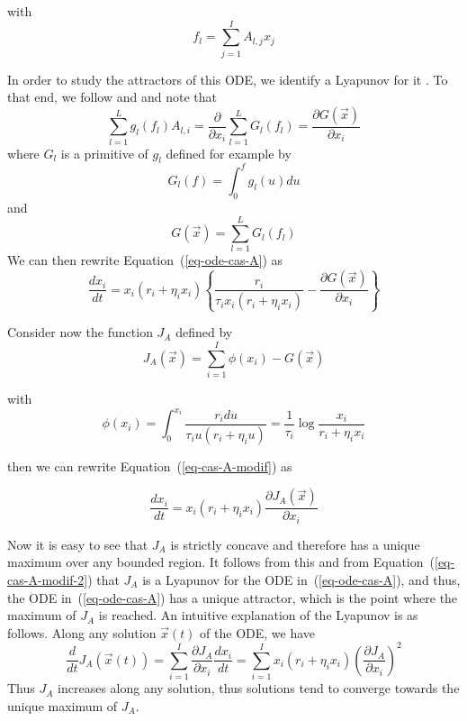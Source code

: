   with
  \begin{equation}
        f_{l} = \sum_{j=1}^{I} A_{l,j} x_{j}
        \label{eq-flux-l}
  \end{equation}

  In order to study the attractors of this ODE, we identify a Lyapunov
  for it \cite{refSurLyapunov}. To that end, we follow \cite{KMT97}
  and \cite{GB98} and note that
  $$
  \sum_{l=1}^{L}
        g_{l}(f_{l})A_{l,i} = \frac{\partial}{\partial x_{i}}\sum_{l=1}^{L}
        G_{l}(f_{l}) = \frac{\partial G (\vec{x})}{\partial x_{i}}
  $$
  where $G_{l}$ is a primitive of $g_{l}$ defined for example by
  $$
  G_{l}(f) = \int_{0}^f g_{l}(u) du
  $$
  and
  $$G(\vec{x}) = \sum_{l=1}^{L} G_{l}(f_{l})
  $$
  We can then rewrite Equation~(\ref{eq-ode-cas-A}) as
  \begin{equation}
                \frac{dx_{i}}{dt}
        =
        x_{i}(r_{i}+ \eta_i x_{i})
        \left \{
            \frac{r_{i}}{\tau_i x_{i}(r_{i}+ \eta_i x_{i})}  -
            \frac{\partial G (\vec{x})}{\partial x_{i}}
        \right \}
        \label{eq-cas-A-modif}
  \end{equation}

  Consider now the function $J_{A}$ defined by
  \begin{equation}
        J_{A}(\vec{x}) = \sum_{i=1}^I \phi(x_{i}) -  G(\vec{x})
        \label{eq-def-de-J}
  \end{equation}

  with
  $$\phi(x_{i}) = \int_{0}^{x_{i}} \frac{r_{i}du}{\tau_i u(r_{i}+ \eta_i u)}=
  \frac{1}{\tau_i}\log \frac{x_{i}}{ r_{i}+ \eta_i x_{i}}
  $$

  then we can rewrite Equation~(\ref{eq-cas-A-modif}) as

  \begin{equation}
                \frac{dx_{i}}{dt}
        =
        x_{i}(r_{i}+ \eta_i x_{i})
        \frac{\partial J_{A} (\vec{x})}{\partial x_{i}}
        \label{eq-cas-A-modif-2}
  \end{equation}

  Now it is easy to see that $J_{A}$ is strictly concave and therefore has a unique
  maximum over any bounded region. It follows from this and from
  Equation~(\ref{eq-cas-A-modif-2}) that $J_{A}$ is a Lyapunov for the ODE
  in~(\ref{eq-ode-cas-A}), and thus, the ODE
  in~(\ref{eq-ode-cas-A}) has a unique attractor, which is the point
  where the maximum of $J_{A}$ is reached. An intuitive explanation of the Lyapunov is as
  follows. Along any
  solution $\vec{x}(t)$ of the ODE, we have
  $$
\frac{d}{dt}J_A(\vec{x}(t)) = \sum_{i=1}^{I} \frac{\partial
J_A}{\partial x_{i}}\frac{dx_i}{dt}
=
\sum_{i=1}^{I} x_i(r_{i}+ \eta_i x_{i})
 \left( \frac{\partial J_A}{\partial x_{i}} \right)^2
  $$
  Thus $J_A$ increases along any solution, thus solutions tend to
  converge towards the unique maximum of $J_A$.

